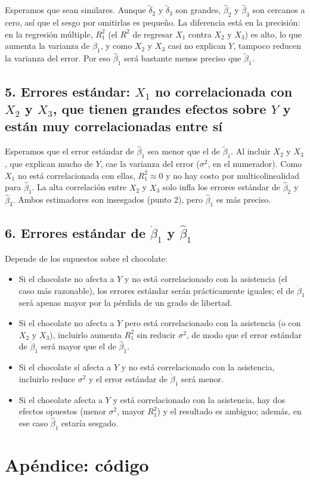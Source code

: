 \documentclass[11pt,a4paper]{article}
\begin{document}
Esperamos que sean similares. Aunque $\tilde\delta_2$ y $\tilde\delta_3$ son grandes, $\hat\beta_2$ y $\hat\beta_3$ son cercanos a cero, así que el sesgo por omitirlas es pequeño. La diferencia está en la precisión: en la regresión múltiple, $R^2_1$ (el $R^2$ de regresar $X_1$ contra $X_2$ y $X_3$) es alto, lo que aumenta la varianza de $\hat\beta_1$, y como $X_2$ y $X_3$ casi no explican $Y$, tampoco reducen la varianza del error. Por eso $\hat\beta_1$ será bastante menos preciso que $\tilde\beta_1$.

\subsection*{5. Errores estándar: $X_1$ no correlacionada con $X_2$ y $X_3$, que tienen grandes efectos sobre $Y$ y están muy correlacionadas entre sí}

Esperamos que el error estándar de $\hat\beta_1$ sea menor que el de $\tilde\beta_1$. Al incluir $X_2$ y $X_3$, que explican mucho de $Y$, cae la varianza del error ($\sigma^2$, en el numerador). Como $X_1$ no está correlacionada con ellas, $R^2_1\approx0$ y no hay costo por multicolinealidad para $\hat\beta_1$. La alta correlación entre $X_2$ y $X_3$ solo infla los errores estándar de $\hat\beta_2$ y $\hat\beta_3$. Ambos estimadores son insesgados (punto 2), pero $\hat\beta_1$ es más preciso.

\subsection*{6. Errores estándar de $\dot\beta_1$ y $\hat\beta_1$}

Depende de los supuestos sobre el chocolate:
\begin{itemize}
  \item Si el chocolate no afecta a $Y$ y no está correlacionado con la asistencia (el caso más razonable), los errores estándar serán prácticamente iguales; el de $\dot\beta_1$ será apenas mayor por la pérdida de un grado de libertad.
  \item Si el chocolate no afecta a $Y$ pero está correlacionado con la asistencia (o con $X_2$ y $X_3$), incluirlo aumenta $R^2_1$ sin reducir $\sigma^2$, de modo que el error estándar de $\dot\beta_1$ será mayor que el de $\hat\beta_1$.
  \item Si el chocolate sí afecta a $Y$ y no está correlacionado con la asistencia, incluirlo reduce $\sigma^2$ y el error estándar de $\dot\beta_1$ será menor.
  \item Si el chocolate afecta a $Y$ y está correlacionado con la asistencia, hay dos efectos opuestos (menor $\sigma^2$, mayor $R^2_1$) y el resultado es ambiguo; además, en ese caso $\hat\beta_1$ estaría sesgado.
\end{itemize}

\newpage
\appendix
\section*{Apéndice: código}

\end{document}
